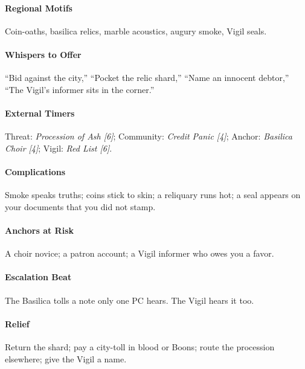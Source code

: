 \paragraph{Regional Motifs} Coin-oaths, basilica relics, marble acoustics, augury smoke, Vigil seals.
\paragraph{Whispers to Offer} ``Bid against the city,'' ``Pocket the relic shard,'' ``Name an innocent debtor,'' ``The Vigil's informer sits in the corner.''
\paragraph{External Timers} Threat: \textit{Procession of Ash [6]}; Community: \textit{Credit Panic [4]}; Anchor: \textit{Basilica Choir [4]}; Vigil: \textit{Red List [6]}.
\paragraph{Complications} Smoke speaks truths; coins stick to skin; a reliquary runs hot; a seal appears on your documents that you did not stamp.
\paragraph{Anchors at Risk} A choir novice; a patron account; a Vigil informer who owes you a favor.
\paragraph{Escalation Beat} The Basilica tolls a note only one PC hears. The Vigil hears it too.
\paragraph{Relief} Return the shard; pay a city-toll in blood or Boons; route the procession elsewhere; give the Vigil a name.

